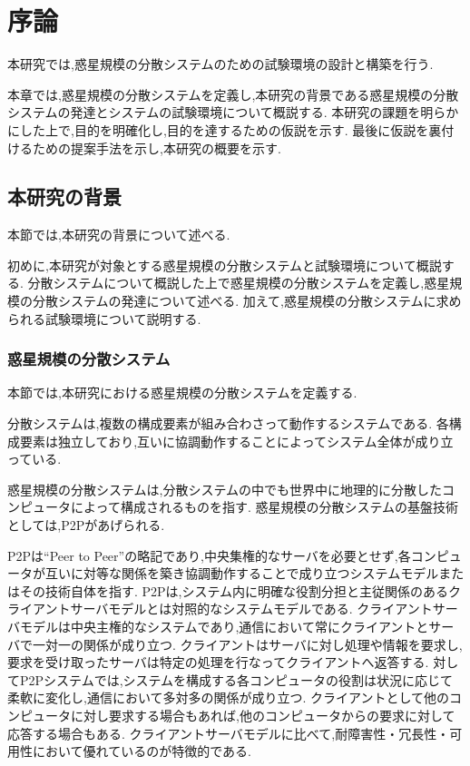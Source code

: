 \chapter{序論}
\label{introduction}

本研究では,惑星規模の分散システムのための試験環境の設計と構築を行う.

本章では,惑星規模の分散システムを定義し,本研究の背景である惑星規模の分散システムの発達とシステムの試験環境について概説する.
本研究の課題を明らかにした上で,目的を明確化し,目的を達するための仮説を示す.
最後に仮説を裏付けるための提案手法を示し,本研究の概要を示す.

\section{本研究の背景}
\label{introduction:background}

本節では,本研究の背景について述べる.

初めに,本研究が対象とする惑星規模の分散システムと試験環境について概説する.
分散システムについて概説した上で惑星規模の分散システムを定義し,惑星規模の分散システムの発達について述べる.
加えて,惑星規模の分散システムに求められる試験環境について説明する.

\subsection{惑星規模の分散システム}

本節では,本研究における惑星規模の分散システムを定義する.

分散システムは,複数の構成要素が組み合わさって動作するシステムである.
各構成要素は独立しており,互いに協調動作することによってシステム全体が成り立っている.

惑星規模の分散システムは,分散システムの中でも世界中に地理的に分散したコンピュータによって構成されるものを指す.
惑星規模の分散システムの基盤技術としては,P2Pがあげられる.

P2Pは``Peer to Peer''の略記であり,中央集権的なサーバを必要とせず,各コンピュータが互いに対等な関係を築き協調動作することで成り立つシステムモデルまたはその技術自体を指す.
P2Pは,システム内に明確な役割分担と主従関係のあるクライアントサーバモデルとは対照的なシステムモデルである.
クライアントサーバモデルは中央主権的なシステムであり,通信において常にクライアントとサーバで一対一の関係が成り立つ.
クライアントはサーバに対し処理や情報を要求し,要求を受け取ったサーバは特定の処理を行なってクライアントへ返答する.
対してP2Pシステムでは,システムを構成する各コンピュータの役割は状況に応じて柔軟に変化し,通信において多対多の関係が成り立つ.
クライアントとして他のコンピュータに対し要求する場合もあれば,他のコンピュータからの要求に対して応答する場合もある.
クライアントサーバモデルに比べて,耐障害性・冗長性・可用性において優れているのが特徴的である.

